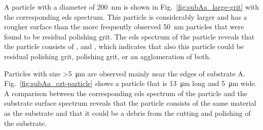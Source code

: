 \begin{comment}
\begin{figure}[htbp]
    \centering
    \subfigure[SEM image at a magnification of 150000$\times$.]{\texttt{[image: substrateA\_a2\_m006.jpg]}\label{fig:substrateA_a2_m006}}
    \subfigure[EDS.]{\texttt{[image: subA\_eds\_alumina02.jpg]}\label{fig:subA_eds_alumina02}}
    \caption[ SEM image and EDS spectrum of a particle on substrate A.]{High resolution scanning electron microscopy (SEM) image of one large and small piece of particles on substrate A and the corresponding \acf{eds} spectrum of the large piece.}
    \label{fig:subA_alumina}
\end{figure}
\end{comment}

A particle with a diameter of \SI{200}{\nano\metre} is shown in Fig.~\ref{fig:subAa_large-grit} with the corresponding \ac{eds} spectrum. This particle is considerably larger and has a rougher surface than the more frequently observed \SI{50}{\nano\metre} particles that were found to be residual polishing grit. The \ac{eds} spectrum of the particle reveals that the particle consists of ,  and , which indicates that also this particle could be residual  polishing grit,  polishing grit, or an agglomeration of both.

\begin{comment}
\begin{figure}[htbp]
    \centering
    \subfigure[SEM image at a magnification of 200000$\times$.]{\texttt{[image: substrateA\_a1\_m016.jpg]}\label{fig:substrateA_a1_m016}}
    \quad
    \subfigure[EDS.]{\texttt{[image: eds\_subA\_SiO2.jpg]}\label{fig:subA_200nm_eds}}
    \caption[]{High resolution scanning electron microscopy (SEM) image and the corresponding \acf{eds} spectrum of a particle on substrate A at a magnification of 200000$\times$).}
    \label{fig:subA_partII}
\end{figure}
\end{comment}

Particles with size \SI{>5}{\micro\metre} are observed mainly near the edges of substrate A. Fig.~\ref{fig:subAa_czt-particle} shows a particle that is \SI{13}{\micro\metre} long and \SI{5}{\micro\metre} wide. A comparison between the corresponding \ac{eds} spectrum of the particle and the substrate surface spectrum reveals that the particle consists of the same material as the substrate and that it could be a debris from the cutting and polishing of the substrate.

